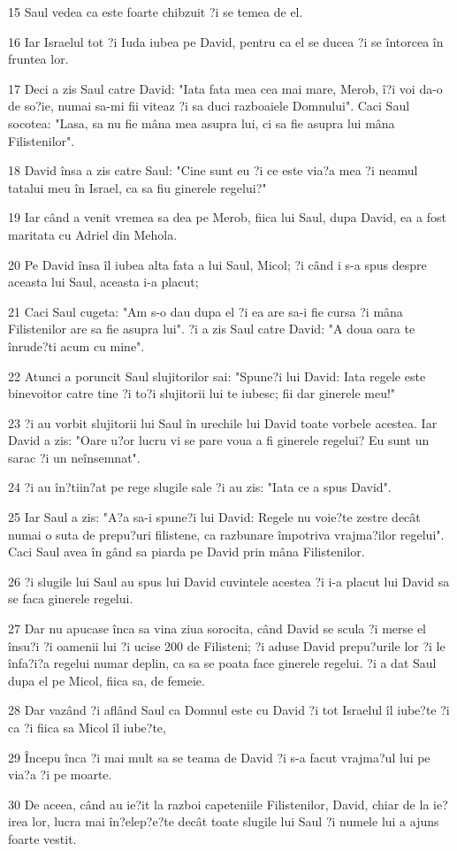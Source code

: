 \par 15 Saul vedea ca este foarte chibzuit ?i se temea de el.
\par 16 Iar Israelul tot ?i Iuda iubea pe David, pentru ca el se ducea ?i se întorcea în fruntea lor.
\par 17 Deci a zis Saul catre David: "Iata fata mea cea mai mare, Merob, î?i voi da-o de so?ie, numai sa-mi fii viteaz ?i sa duci razboaiele Domnului". Caci Saul socotea: "Lasa, sa nu fie mâna mea asupra lui, ci sa fie asupra lui mâna Filistenilor".
\par 18 David însa a zis catre Saul: "Cine sunt eu ?i ce este via?a mea ?i neamul tatalui meu în Israel, ca sa fiu ginerele regelui?"
\par 19 Iar când a venit vremea sa dea pe Merob, fiica lui Saul, dupa David, ea a fost maritata cu Adriel din Mehola.
\par 20 Pe David însa îl iubea alta fata a lui Saul, Micol; ?i când i s-a spus despre aceasta lui Saul, aceasta i-a placut;
\par 21 Caci Saul cugeta: "Am s-o dau dupa el ?i ea are sa-i fie cursa ?i mâna Filistenilor are sa fie asupra lui". ?i a zis Saul catre David: "A doua oara te înrude?ti acum cu mine".
\par 22 Atunci a poruncit Saul slujitorilor sai: "Spune?i lui David: Iata regele este binevoitor catre tine ?i to?i slujitorii lui te iubesc; fii dar ginerele meu!"
\par 23 ?i au vorbit slujitorii lui Saul în urechile lui David toate vorbele acestea. Iar David a zis: "Oare u?or lucru vi se pare voua a fi ginerele regelui? Eu sunt un sarac ?i un neînsemnat".
\par 24 ?i au în?tiin?at pe rege slugile sale ?i au zis: "Iata ce a spus David".
\par 25 Iar Saul a zis: "A?a sa-i spune?i lui David: Regele nu voie?te zestre decât numai o suta de prepu?uri filistene, ca razbunare împotriva vrajma?ilor regelui". Caci Saul avea în gând sa piarda pe David prin mâna Filistenilor.
\par 26 ?i slugile lui Saul au spus lui David cuvintele acestea ?i i-a placut lui David sa se faca ginerele regelui.
\par 27 Dar nu apucase înca sa vina ziua sorocita, când David se scula ?i merse el însu?i ?i oamenii lui ?i ucise 200 de Filisteni; ?i aduse David prepu?urile lor ?i le înfa?i?a regelui numar deplin, ca sa se poata face ginerele regelui. ?i a dat Saul dupa el pe Micol, fiica sa, de femeie.
\par 28 Dar vazând ?i aflând Saul ca Domnul este cu David ?i tot Israelul îl iube?te ?i ca ?i fiica sa Micol îl iube?te,
\par 29 Începu înca ?i mai mult sa se teama de David ?i s-a facut vrajma?ul lui pe via?a ?i pe moarte.
\par 30 De aceea, când au ie?it la razboi capeteniile Filistenilor, David, chiar de la ie?irea lor, lucra mai în?elep?e?te decât toate slugile lui Saul ?i numele lui a ajuns foarte vestit.

